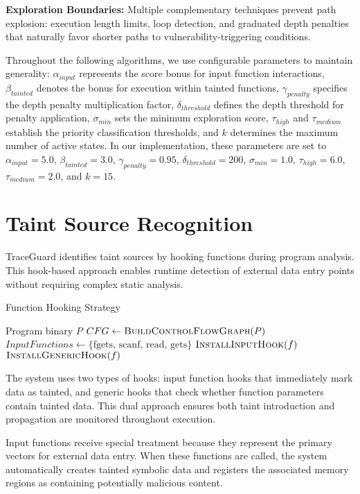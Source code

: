 \textbf{Exploration Boundaries:} Multiple complementary techniques prevent path explosion: execution length limits, loop detection, and graduated depth penalties that naturally favor shorter paths to vulnerability-triggering conditions.

Throughout the following algorithms, we use configurable parameters to maintain generality: $\alpha_{input}$ represents the score bonus for input function interactions, $\beta_{tainted}$ denotes the bonus for execution within tainted functions, $\gamma_{penalty}$ specifies the depth penalty multiplication factor, $\delta_{threshold}$ defines the depth threshold for penalty application, $\sigma_{min}$ sets the minimum exploration score, $\tau_{high}$ and $\tau_{medium}$ establish the priority classification thresholds, and $k$ determines the maximum number of active states. In our implementation, these parameters are set to $\alpha_{input} = 5.0$, $\beta_{tainted} = 3.0$, $\gamma_{penalty} = 0.95$, $\delta_{threshold} = 200$, $\sigma_{min} = 1.0$, $\tau_{high} = 6.0$, $\tau_{medium} = 2.0$, and $k = 15$.

\section{Taint Source Recognition}

TraceGuard identifies taint sources by hooking functions during program analysis. This hook-based approach enables runtime detection of external data entry points without requiring complex static analysis.

\begin{algorithm}
\caption{Function Hooking Strategy}
\begin{algorithmic}[1]
\Require Program binary $P$
\State $CFG \gets \textsc{BuildControlFlowGraph}(P)$
\State $InputFunctions \gets \{\text{fgets, scanf, read, gets}\}$
        \State $\textsc{InstallInputHook}(f)$
    \Else
        \State $\textsc{InstallGenericHook}(f)$
    \EndIf
\EndFor
\end{algorithmic}
\end{algorithm}

The system uses two types of hooks: input function hooks that immediately mark data as tainted, and generic hooks that check whether function parameters contain tainted data. This dual approach ensures both taint introduction and propagation are monitored throughout execution.

Input functions receive special treatment because they represent the primary vectors for external data entry. When these functions are called, the system automatically creates tainted symbolic data and registers the associated memory regions as containing potentially malicious content.

